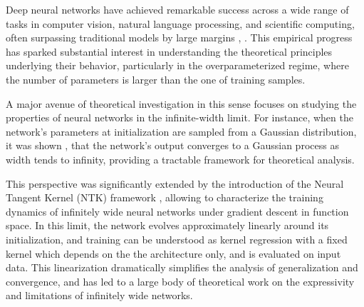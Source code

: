 \documentclass{article}
\theoremstyle{definition}
\theoremstyle{remark}
\numberwithin{equation}{section}
\begin{document}

Deep neural networks have achieved remarkable success across a wide range of tasks in computer vision, 
natural language processing, and scientific computing, often surpassing traditional models by large margins \cite{lecun2015deep}, \cite{goodfellow2016deep}. 
This empirical progress has sparked substantial interest in understanding the theoretical principles underlying their behavior, 
particularly in the overparameterized regime, where the number of parameters is larger than the one of training samples.

A major avenue of theoretical investigation in this sense focuses on studying the properties of neural networks in the infinite-width limit. 
For instance, when the network's parameters at initialization are sampled from a Gaussian distribution, it was shown \cite{neal96}, \cite{Matthews2018GaussianPB} 
that the network's output converges to a Gaussian process as width tends to infinity, 
providing a tractable framework for theoretical analysis.

This perspective was significantly extended by the introduction of the Neural Tangent Kernel (NTK) framework \cite{jacot}, 
allowing to characterize the training dynamics of infinitely wide neural networks under gradient descent in function space. 
In this limit, the network evolves approximately linearly around its initialization, 
and training can be understood as kernel regression with a fixed 
kernel which depends on the the architecture only, and is evaluated on input data.
This linearization dramatically simplifies the analysis of generalization and convergence, 
and has led to a large body of theoretical work on the expressivity and limitations of infinitely wide networks.
\end{document}
